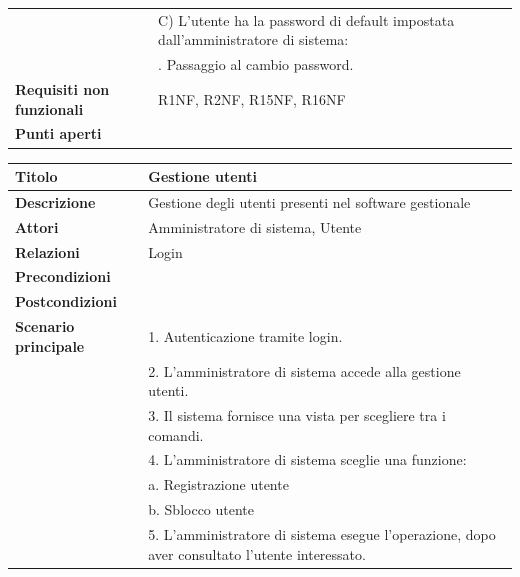 \documentclass[a4paper]{article}
\begin{document}
\begin{table}[ht!]
\begin{center}
\begin{tabulary}{1\textwidth}{l|L}
                                     & C) L'utente ha la password di default impostata dall'amministratore di sistema:\\
                                     & . Passaggio al cambio password.\\
        \hline
        \textbf{Requisiti non funzionali} & R1NF, R2NF, R15NF, R16NF \\
        \hline
        \textbf{Punti aperti} & \\
        \hline
    \end{tabulary}
  \end{center}
\end{table}


\begin{table}[ht!]
  \begin{center}
    \begin{tabulary}{1\textwidth}{l|L}
        \textbf{Titolo} & Gestione utenti \\
        \hline
        \textbf{Descrizione} & Gestione degli utenti presenti nel software gestionale \\
        \hline
        \textbf{Attori} & Amministratore di sistema, Utente \\
        \hline
        \textbf{Relazioni} & Login \\
        \hline
        \textbf{Precondizioni} &  \\
        \hline
        \textbf{Postcondizioni} &  \\
        \hline
        \textbf{Scenario principale} & 1. Autenticazione tramite login. \\
                                     & 2. L'amministratore di sistema accede alla gestione utenti. \\
                                     & 3. Il sistema fornisce una vista per scegliere tra i comandi. \\
                                     & 4. L'amministratore di sistema sceglie una funzione: \\
                                     & \quad a. Registrazione utente \\
                                     & \quad b. Sblocco utente \\
                                     & 5. L'amministratore di sistema esegue l'operazione, dopo aver consultato l'utente interessato.\\

\end{tabulary}
\end{center}
\end{table}
\end{document}
